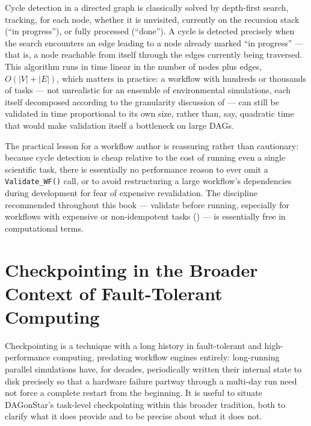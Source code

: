 Cycle detection in a directed graph is classically solved by depth-first
search, tracking, for each node, whether it is unvisited, currently on the
recursion stack (``in progress''), or fully processed (``done''). A cycle is
detected precisely when the search encounters an edge leading to a node
already marked ``in progress'' --- that is, a node reachable from itself
through the edges currently being traversed. This algorithm runs in time
linear in the number of nodes plus edges, $O(|V| + |E|)$, which matters in
practice: a workflow with hundreds or thousands of tasks --- not unrealistic
for an ensemble of environmental simulations, each itself decomposed
according to the granularity discussion of  ---
can still be validated in time proportional to its own size, rather than,
say, quadratic time that would make validation itself a bottleneck on large
DAGs.

\begin{practicebox}
The practical lesson for a workflow author is reassuring rather than
cautionary: because cycle detection is cheap relative to the cost of running
even a single scientific task, there is essentially no performance reason to
ever omit a \texttt{Validate\_WF()} call, or to avoid restructuring a large
workflow's dependencies during development for fear of expensive
revalidation. The discipline recommended throughout this book --- validate
before running, especially for workflows with expensive or non-idempotent
tasks () --- is essentially free in computational
terms.
\end{practicebox}

\section{Checkpointing in the Broader Context of Fault-Tolerant Computing}

Checkpointing is a technique with a long history in fault-tolerant and
high-performance computing, predating workflow engines entirely: long-running
parallel simulations have, for decades, periodically written their internal
state to disk precisely so that a hardware failure partway through a
multi-day run need not force a complete restart from the beginning. It is
useful to situate DAGonStar's task-level checkpointing within this broader
tradition, both to clarify what it does provide and to be precise about
what it does not.

